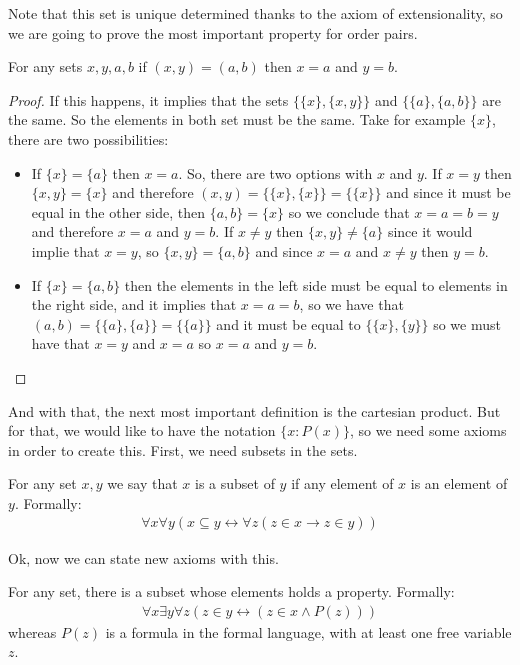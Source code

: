 \documentclass{tufte-handout}
\begin{document}
Note that this set is unique determined thanks to the axiom of extensionality, so we are going to prove the most important property for order pairs.

\begin{theorem}
	For any sets $x, y, a, b$ if $(x, y) = (a, b)$ then $x = a$ and $y = b$.
\end{theorem}
\begin{proof}
	If this happens, it implies that the sets $\{\{x\}, \{x, y\}\}$ and $\{\{a\}, \{a, b\}\}$ are the same. So the elements in both set must be the same. Take for example $\{x\}$, there are two possibilities:
	\begin{itemize}
		\item If $\{x\} = \{a\}$ then $x = a$. So, there are two options with $x$ and $y$. If $x = y$ then $\{x, y\} = \{x\}$ and therefore $(x, y) = \{\{x\}, \{x\}\} = \{\{x\}\}$ and since it must be equal in the other side, then $\{a, b\} = \{x\}$ so we conclude that $x = a = b = y$ and therefore $x = a$ and $y = b$. If $x \neq y$ then $\{x, y\} \neq \{a\}$ since it would implie that $x = y$, so $\{x, y\} = \{a, b\}$ and since $x = a$ and $x \neq y$ then $y = b$.
		\item If $\{x\} = \{a, b\}$ then the elements in the left side must be equal to elements in the right side, and it implies that $x = a = b$, so we have that $(a, b) = \{\{a\}, \{a\}\} = \{\{a\}\}$ and it must be equal to $\{\{x\}, \{y\}\}$ so we must have that $x = y$ and $x = a$ so $x = a$ and $y = b$.
	\end{itemize}
\end{proof}

And with that, the next most important definition is the cartesian product. But for that, we would like to have the notation $\{x: P(x)\}$, so we need some axioms in order to create this. First, we need subsets in the sets.

\begin{definition}[Subset]
	For any set $x, y$ we say that $x$ is a subset of $y$ if any element of $x$ is an element of $y$. Formally:
	\begin{align*}
		\forall x \forall y(x \subseteq y \leftrightarrow \forall z(z \in x \rightarrow z \in y))
	\end{align*}
\end{definition}

Ok, now we can state new axioms with this.
\begin{axiom}
	For any set, there is a subset whose elements holds a property. Formally:
	\begin{align*}
		\forall x \exists y \forall z(z \in y \leftrightarrow (z \in x \wedge P(z)))
	\end{align*}
	whereas $P(z)$ is a formula in the formal language, with at least one free variable $z$.
\end{axiom}
\end{document}
